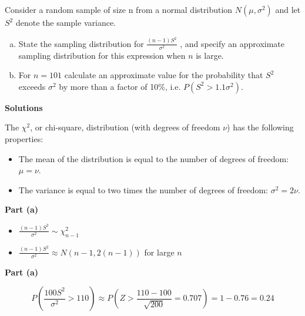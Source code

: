 \documentclass[a4paper,12pt]{article}
\begin{document}
\large
\noindent Consider a random sample of size n from a normal distribution $N( \mu, \sigma^2)$ and let $S^2$
denote the sample variance.
\begin{enumerate}[(a)]
    \item  State the sampling distribution for
${ \displaystyle \frac{(n-1)S^2}{\sigma^2} }$
, and specify an approximate
sampling distribution for this expression when $n$ is large. 
    \item For $n = 101$ calculate an approximate value for the probability that $S^2$ exceeds
$\sigma^2$ by more than a factor of 10\%, i.e. $P(S^2 > 1.1 \sigma^2)$. 

\end{enumerate}

\medskip 
\large
\noindent \textbf{Solutions}\\

\begin{framed}
\large
\noindent The $\chi^2$, or chi-square, distribution (with degrees of freedom $\nu$) has the following properties:

\begin{itemize}
    \item The mean of the distribution is equal to the number of degrees of freedom: $\mu = \nu$. 
    \item The variance is equal to two times the number of degrees of freedom: $\sigma^2 = 2\nu$.
\end{itemize}
\end{framed}
\large 
\medskip 
\noindent \textbf{Part (a)}
\begin{itemize}
    \item ${ \displaystyle \frac{(n-1)S^2}{\sigma^2} } \sim \chi^2_{n-1}$

\item ${ \displaystyle \frac{(n-1)S^2}{\sigma^2} } \approx N \left(n-1,2(n-1) \right)$ for large $n$
\end{itemize}

\medskip 
\noindent \textbf{Part (a)}

\[P \left(  \frac{100 S^2}{\sigma^2} > 110 \right)
\approx P \left( Z > \frac{110-100}{\sqrt{200}} = 0.707 \right)  = 1-0.76=0.24 \]

\end{document}
